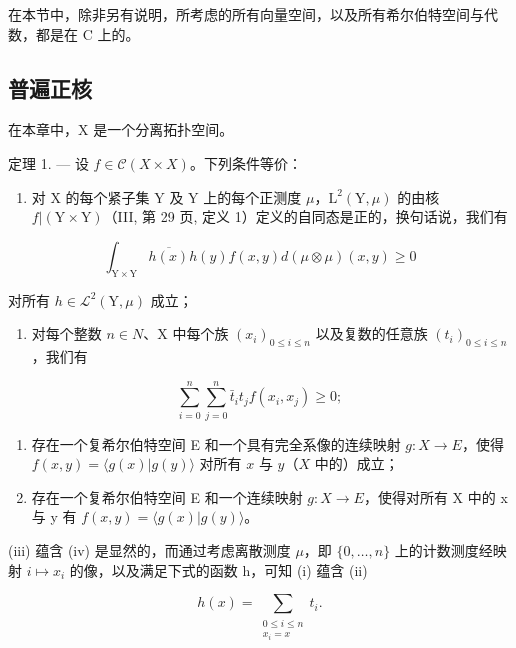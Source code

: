 在本节中，除非另有说明，所考虑的所有向量空间，以及所有希尔伯特空间与代数，都是在 C 上的。

\subsection{普遍正核}

在本章中，X 是一个分离拓扑空间。

定理 1. --- 设 \(f \in \mathcal{C}(X \times X)\)。下列条件等价：

\begin{enumerate}
\def\labelenumi{(\roman{enumi})}
\tightlist
\item
  对 X 的每个紧子集 Y 及 Y 上的每个正测度 \(\mu\)，\(\mathrm{L}^{2}(\mathrm{Y},\mu)\) 的由核 \(f|(\mathrm{Y}\times\mathrm{Y})\)（III, 第 29 页, 定义 1）定义的自同态是正的，换句话说，我们有
\end{enumerate}

\[
\int_ {\mathrm{Y} \times \mathrm{Y}} \overline {{h (x)}} h (y) f (x, y) d (\mu \otimes \mu) (x, y) \geqslant 0
\]

对所有 \(h \in \mathcal{L}^{2}(\mathrm{Y}, \mu)\) 成立；

\begin{enumerate}
\def\labelenumi{(\roman{enumi})}
\setcounter{enumi}{1}
\tightlist
\item
  对每个整数 \(n \in N\)、X 中每个族 \((x_{i})_{0 \leqslant i \leqslant n}\) 以及复数的任意族 \((t_{i})_{0 \leqslant i \leqslant n}\)，我们有
\end{enumerate}

\[
\sum_ {i = 0} ^ {n} \sum_ {j = 0} ^ {n} \bar {t} _ {i} t _ {j} f (x _ {i}, x _ {j}) \geqslant 0;
\]

\begin{enumerate}
\def\labelenumi{(\roman{enumi})}
\setcounter{enumi}{2}
\item
  存在一个复希尔伯特空间 E 和一个具有完全系像的连续映射 \(g \colon X \to E\)，使得 \(f(x, y) = \langle g(x) | g(y) \rangle\) 对所有 \(x\) 与 \(y\)（\(X\) 中的）成立；
\item
  存在一个复希尔伯特空间 E 和一个连续映射 \(g: X \to E\)，使得对所有 X 中的 x 与 y 有 \(f(x, y) = \langle g(x) | g(y) \rangle\)。
\end{enumerate}

(iii) 蕴含 (iv) 是显然的，而通过考虑离散测度 \(\mu\)，即 \(\{0,\ldots,n\}\) 上的计数测度经映射 \(i\mapsto x_{i}\) 的像，以及满足下式的函数 h，可知 (i) 蕴含 (ii)

\[
h(x) = \sum_{\substack{0\leqslant i\leqslant n\\ x_{i} = x}}t_{i}.
\]

